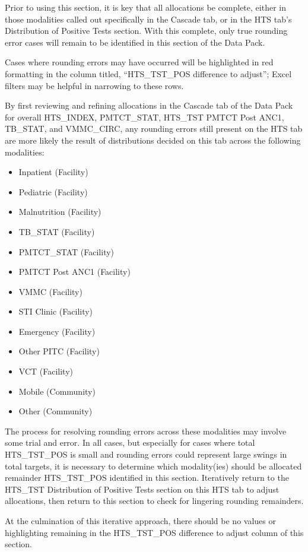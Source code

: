 \documentclass[
  openany]{book}
\begin{document}
Prior to using this section, it is key that all allocations be complete,
either in those modalities called out specifically in the Cascade tab,
or in the HTS tab's Distribution of Positive Tests section. With this
complete, only true rounding error cases will remain to be identified in
this section of the Data Pack.

Cases where rounding errors may have occurred will be highlighted in red
formatting in the column titled, ``HTS\_TST\_POS difference to adjust'';
Excel filters may be helpful in narrowing to these rows.

By first reviewing and refining allocations in the Cascade tab of the
Data Pack for overall HTS\_INDEX, PMTCT\_STAT, HTS\_TST PMTCT Post ANC1,
TB\_STAT, and VMMC\_CIRC, any rounding errors still present on the HTS tab
are more likely the result of distributions decided on this tab across
the following modalities:

\begin{itemize}
\item
  Inpatient (Facility)
\item
  Pediatric (Facility)
\item
  Malnutrition (Facility)
\item
  TB\_STAT (Facility)
\item
  PMTCT\_STAT (Facility)
\item
  PMTCT Post ANC1 (Facility)
\item
  VMMC (Facility)
\item
  STI Clinic (Facility)
\item
  Emergency (Facility)
\item
  Other PITC (Facility)
\item
  VCT (Facility)
\item
  Mobile (Community)
\item
  Other (Community)
\end{itemize}

The process for resolving rounding errors across these modalities may
involve some trial and error. In all cases, but especially for cases
where total HTS\_TST\_POS is small and rounding errors could represent
large swings in total targets, it is necessary to determine which
modality(ies) should be allocated remainder HTS\_TST\_POS identified in
this section. Iteratively return to the HTS\_TST Distribution of Positive
Tests section on this HTS tab to adjust allocations, then return to this
section to check for lingering rounding remainders.

At the culmination of this iterative approach, there should be no values
or highlighting remaining in the HTS\_TST\_POS difference to adjust column
of this section.
\end{document}
